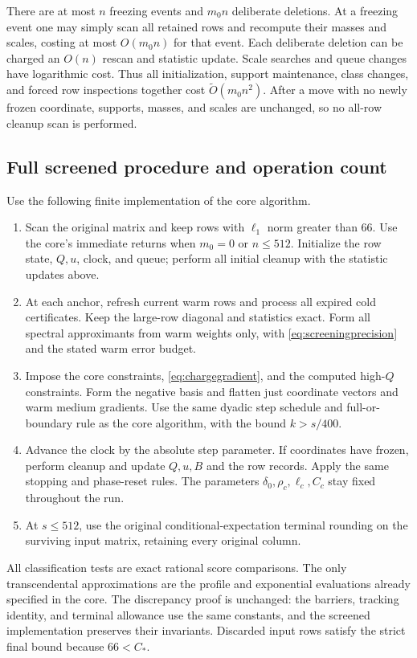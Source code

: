 \documentclass[11pt]{amsart}
\theoremstyle{remark}\newtheorem{remark}[theorem]{Remark}
\begin{document}
There are at most $n$ freezing events and $m_0n$ deliberate deletions.
At a freezing event one may simply scan all retained rows and recompute
their masses and scales, costing at most $O(m_0n)$ for that event.
Each deliberate deletion can be charged an $O(n)$ rescan and statistic
update. Scale searches and queue changes have logarithmic cost.
Thus all initialization, support maintenance, class changes, and forced
row inspections together cost $\widetilde O(m_0n^2)$.
After a move with no newly frozen coordinate, supports, masses, and scales
are unchanged, so no all-row cleanup scan is performed.

\subsection{Full screened procedure and operation count}
Use the following finite implementation of the core algorithm.
\begin{enumerate}
\item Scan the original matrix and keep rows with $\ell_1$ norm greater
than 66. Use the core's immediate returns when $m_0=0$ or $n\le512$.
Initialize the row state, $Q,u$, clock, and queue;
perform all initial cleanup with the statistic updates above.
\item At each anchor, refresh current warm rows and process all expired
cold certificates. Keep the large-row diagonal and statistics exact.
Form all spectral approximants from warm weights only, with
\eqref{eq:screeningprecision} and the stated warm error budget.
\item Impose the core constraints, \eqref{eq:chargegradient}, and the
computed high-$Q$ constraints. Form the negative basis and flatten just
coordinate vectors and warm medium gradients. Use the same dyadic step
schedule and full-or-boundary rule as the core algorithm, with the bound
$k>s/400$.
\item Advance the clock by the absolute step parameter. If coordinates
have frozen, perform cleanup and update $Q,u,B$ and the row records.
Apply the same stopping and phase-reset rules. The parameters
$\delta_0,\rho_c,\ell_c,C_c$ stay fixed throughout the run.
\item At $s\le512$, use the original conditional-expectation terminal
rounding on the surviving input matrix, retaining every original column.
\end{enumerate}
All classification tests are exact rational score comparisons. The only
transcendental approximations are the profile and exponential evaluations
already specified in the core. The discrepancy proof is unchanged:
the barriers, tracking identity, and terminal allowance use the same
constants, and the screened implementation preserves their invariants.
Discarded input rows satisfy the strict final bound because $66<C_*$.
\end{document}
